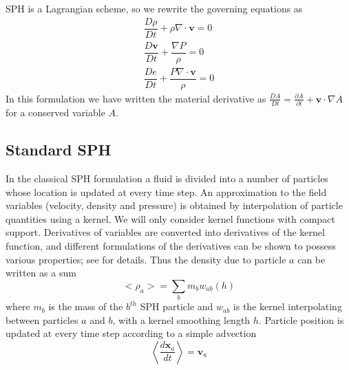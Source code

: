 SPH is a Lagrangian scheme, so we rewrite the governing equations as
\begin{align}   %
\dfrac{D \rho}{D t} + \rho \nabla \cdot \textbf{v} = 0 \label{eq:gov-nc-rho}\\
\dfrac{D \textbf{v}}{D t} + \dfrac{\nabla P}{\rho} =0 \label{eq:gov-nc-v}\\
\dfrac{D e}{D t} + \dfrac{P \nabla \cdot \textbf{v}}{\rho} = 0 \label{eq:gov-nc-e}
\end{align}
In this formulation we have written the material derivative as 
$\frac{D A}{Dt} = \frac{\partial A}{\partial t} + \textbf{v} \cdot \nabla A$ for a conserved variable $A$.

\subsection{Standard SPH} \label{standard-sph}
In the classical SPH formulation a fluid is divided into a number of particles whose location is updated at every time step. An approximation to the field variables (velocity, density and pressure) is obtained by interpolation of particle quantities using a kernel.
We will only consider kernel functions with compact support. Derivatives of variables are converted into derivatives of the kernel function, and different formulations of the derivatives can be shown to possess various properties; see \citep{monaghan1992smoothed,monaghan2005smoothed,liu2010smoothed, price2012smoothed} for details. Thus the density due to particle $a$ can be written as a sum
\begin{equation}
<\rho_a> = \sum_b m_b w_{ab} \left(h\right) \label{eq:ns-sph-d}
\end{equation}
where $m_b$ is the  mass of the $b^{th}$ SPH particle and $w_{ab}$ is the kernel interpolating between particles $a$ and $b$, with a kernel smoothing length $h$. Particle position is updated at every time step according to a simple advection
\begin{equation}
\left\langle\dfrac{d \textbf{x}_a}{dt}\right\rangle = \textbf{v}_a \label{eq:SPH-update-pos}
\end{equation}

